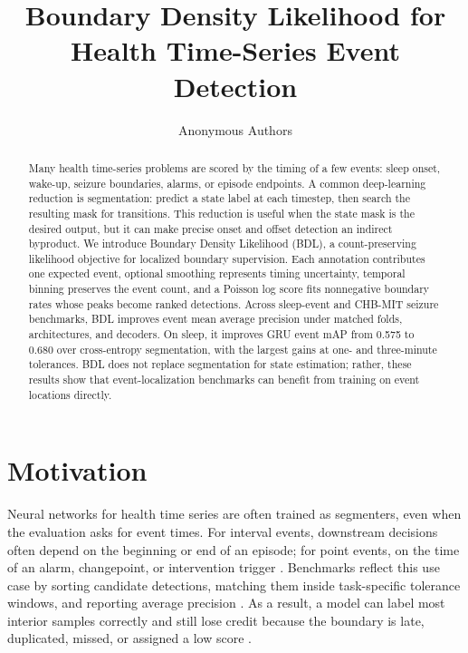 \documentclass{article}
\title{Boundary Density Likelihood for Health Time-Series Event Detection}
\author{Anonymous Authors}
\begin{document}
\maketitle

\begin{abstract}
Many health time-series problems are scored by the timing of a few events:
sleep onset, wake-up, seizure boundaries, alarms, or episode endpoints.
A common deep-learning reduction is segmentation: predict a state label at
each timestep, then search the resulting mask for transitions.
This reduction is useful when the state mask is the desired output, but it can
make precise onset and offset detection an indirect byproduct.
We introduce Boundary Density Likelihood (BDL), a count-preserving likelihood
objective for localized boundary supervision.
Each annotation contributes one expected event, optional smoothing represents
timing uncertainty, temporal binning preserves the event count, and a Poisson
log score fits nonnegative boundary rates whose peaks become ranked
detections.
Across sleep-event and CHB-MIT seizure benchmarks, BDL improves event mean
average precision under matched folds, architectures, and decoders.
On sleep, it improves GRU event mAP from 0.575 to 0.680 over cross-entropy
segmentation, with the largest gains at one- and three-minute tolerances.
BDL does not replace segmentation for state estimation; rather, these results
show that event-localization benchmarks can benefit from training on event
locations directly.
\end{abstract}

\section{Motivation}

Neural networks for health time series are often trained as segmenters, even
when the evaluation asks for event times.
For interval events, downstream decisions often depend on the beginning or end
of an episode; for point events, on the time of an alarm, changepoint, or
intervention trigger
\citep{shoeb2010,goldberger2000,alexander2017,esper2023}.
Benchmarks reflect this use case by sorting candidate detections, matching
them inside task-specific tolerance windows, and reporting average precision
\citep{everingham2010pascal,lin2014coco,salles2023}.
As a result, a model can label most interior samples correctly and still lose
credit because the boundary is late, duplicated, missed, or assigned a low
score \citep{tatbul2018precision}.
\end{document}

